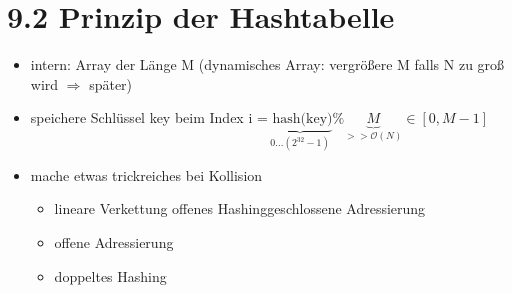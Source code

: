 \documentclass[11pt, fleqn]{scrreprt}
\newcommand{\bigO}[0]{\mathcal{O}}
\begin{document}
\section*{9.2 Prinzip der Hashtabelle}
\begin{itemize}
    \item intern: Array der Länge M (dynamisches Array: vergrößere M falls N zu groß wird $\Rightarrow$ später)
    \item speichere Schlüssel key beim Index i =$\underbrace{\text{ hash(key)}}_{0...(2^{32}-1)} \% \underbrace{M}_{>> \bigO{}(N)} \in [0, M-1]$
    \item mache etwas trickreiches bei Kollision
    \begin{itemize}
        \item lineare Verkettung \hspace*{5mm} \glqq offenes Hashing\grqq \glqq geschlossene Adressierung\grqq
        \item offene Adressierung
        \item doppeltes Hashing
    \end{itemize}
\end{itemize}
\end{document}
